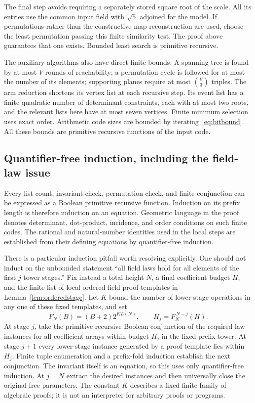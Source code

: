 The final step avoids requiring a separately stored square root of
the scale. All its entries use the common input field with $\sqrt5$
adjoined for the model. If permutations rather than the constructive
map reconstruction are used, choose the least permutation passing
this finite similarity test. The proof above guarantees that one
exists. Bounded least search is primitive recursive.

The auxiliary algorithms also have direct finite bounds. A spanning
tree is found by at most $V$ rounds of reachability; a permutation
cycle is followed for at most the number of its elements; supporting
planes require at most $\binom V3$ triples. The arm reduction shortens
its vertex list at each recursive step. Its event list has a finite
quadratic number of determinant constraints, each with at most two
roots, and the relevant lists here have at most seven vertices.
Finite minimum selection uses exact order. Arithmetic code sizes
are bounded by iterating~\eqref{eq:bitbound}. All these bounds are
primitive recursive functions of the input code.

\subsection{Quantifier-free induction, including the field-law issue}

Every list count, invariant check, permutation check, and finite
conjunction can be expressed as a Boolean primitive recursive
function. Induction on its prefix length is therefore induction
on an equation. Geometric language in the proof denotes determinant,
dot-product, incidence, and order conditions on such finite codes.
The rational and natural-number identities used in the local steps
are established from their defining equations by quantifier-free
induction.

There is a particular induction pitfall worth resolving explicitly.
One should not induct on the unbounded statement ``all field laws
hold for all elements of the first $j$ tower stages.'' Fix instead a
total height $N$, a final coefficient budget $H$, and the finite list
of local ordered-field proof templates in Lemma~\ref{lem:orderedstage}.
Let $K$ bound the number
of lower-stage operations in any one of these fixed templates, and set
\[
 F_N(B)=(B+2)2^{K L(N)},\qquad
 H_j=F_N^{\,N-j}(H).
\]
At stage $j$, take the primitive recursive Boolean conjunction of
the required law instances for all coefficient arrays within budget
$H_j$ in the fixed prefix tower. At stage $j+1$ every lower-stage
instance generated by a proof template lies within $H_j$. Finite
tuple enumeration and a prefix-fold induction establish the next
conjunction. The invariant itself is an equation, so this uses only
quantifier-free induction. At $j=N$ extract the desired instances
and then universally close the original free parameters. The
constant $K$ describes a fixed finite family of algebraic proofs;
it is not an interpreter for arbitrary proofs or programs.

